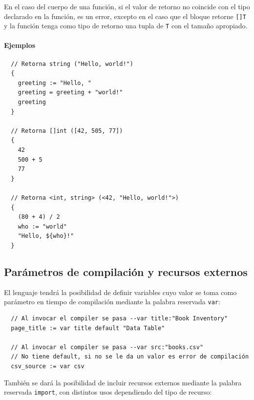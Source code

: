 En el caso del cuerpo de una función, si el valor de retorno no coincide con el
tipo declarado en la función, es un error, excepto en el caso que el bloque
retorne \texttt{[]T} y la función tenga como tipo de retorno una tupla de
\texttt{T} con el tamaño apropiado.

\paragraph{Ejemplos}
\small
\begin{verbatim}
  // Retorna string ("Hello, world!")
  {
    greeting := "Hello, "
    greeting = greeting + "world!"
    greeting
  }

  // Retorna []int ([42, 505, 77])
  {
    42
    500 + 5
    77
  }

  // Retorna <int, string> (<42, "Hello, world!">)
  {
    (80 + 4) / 2
    who := "world"
    "Hello, ${who}!"
  }
\end{verbatim}
\normalsize

\subsection{Parámetros de compilación y recursos externos}

El lenguaje tendrá la posibilidad de definir variables cuyo valor se toma como
parámetro en tiempo de compilación mediante la palabra reservada \texttt{var}:

\small
\begin{verbatim}
  // Al invocar el compiler se pasa --var title:"Book Inventory"
  page_title := var title default "Data Table"

  // Al invocar el compiler se pasa --var src:"books.csv"
  // No tiene default, si no se le da un valor es error de compilación
  csv_source := var csv
\end{verbatim}
\normalsize

También se dará la posibilidad de incluir recursos externos mediante la palabra
reservada \texttt{import}, con distintos usos dependiendo del tipo de recurso:

